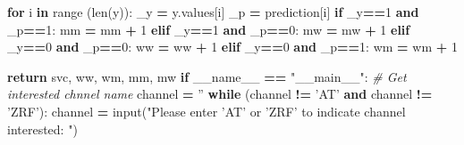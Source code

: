 \documentclass[10pt,letterpaper]{article}
\newenvironment{Shaded}{\begin{snugshade}}{\end{snugshade}}
\newcommand{\DecValTok}[1]{\textcolor[rgb]{0.00,0.00,0.81}{{#1}}}
\newcommand{\StringTok}[1]{\textcolor[rgb]{0.31,0.60,0.02}{{#1}}}
\newcommand{\CommentTok}[1]{\textcolor[rgb]{0.56,0.35,0.01}{\textit{{#1}}}}
\newcommand{\VariableTok}[1]{\textcolor[rgb]{0.00,0.00,0.00}{{#1}}}
\newcommand{\ControlFlowTok}[1]{\textcolor[rgb]{0.13,0.29,0.53}{\textbf{{#1}}}}
\newcommand{\OperatorTok}[1]{\textcolor[rgb]{0.81,0.36,0.00}{\textbf{{#1}}}}
\newcommand{\BuiltInTok}[1]{{#1}}
\newcommand{\NormalTok}[1]{{#1}}
\begin{document}
\begin{Shaded}
\begin{Highlighting}[]
    \ControlFlowTok{for} \NormalTok{i }\OperatorTok{in} \BuiltInTok{range} \NormalTok{(}\BuiltInTok{len}\NormalTok{(y)):}
        \NormalTok{_y }\OperatorTok{=} \NormalTok{y.values[i]}
        \NormalTok{_p }\OperatorTok{=} \NormalTok{prediction[i]}
        \ControlFlowTok{if} \NormalTok{_y}\OperatorTok{==}\DecValTok{1} \OperatorTok{and} \NormalTok{_p}\OperatorTok{==}\DecValTok{1}\NormalTok{:}
            \NormalTok{mm }\OperatorTok{=} \NormalTok{mm }\OperatorTok{+} \DecValTok{1}
        \ControlFlowTok{elif} \NormalTok{_y}\OperatorTok{==}\DecValTok{1} \OperatorTok{and} \NormalTok{_p}\OperatorTok{==}\DecValTok{0}\NormalTok{:}
            \NormalTok{mw }\OperatorTok{=} \NormalTok{mw }\OperatorTok{+} \DecValTok{1}
        \ControlFlowTok{elif} \NormalTok{_y}\OperatorTok{==}\DecValTok{0} \OperatorTok{and} \NormalTok{_p}\OperatorTok{==}\DecValTok{0}\NormalTok{:}
            \NormalTok{ww }\OperatorTok{=} \NormalTok{ww }\OperatorTok{+} \DecValTok{1}
        \ControlFlowTok{elif} \NormalTok{_y}\OperatorTok{==}\DecValTok{0} \OperatorTok{and} \NormalTok{_p}\OperatorTok{==}\DecValTok{1}\NormalTok{:}
            \NormalTok{wm }\OperatorTok{=} \NormalTok{wm }\OperatorTok{+} \DecValTok{1}
    
    \ControlFlowTok{return} \NormalTok{svc, ww, wm, mm, mw}
\ControlFlowTok{if} \VariableTok{__name__} \OperatorTok{==} \StringTok{"__main__"}\NormalTok{:}
    \CommentTok{# Get interested chnnel name}
    \NormalTok{channel }\OperatorTok{=} \StringTok{''}
    \ControlFlowTok{while} \NormalTok{(channel }\OperatorTok{!=} \StringTok{'AT'} \OperatorTok{and} \NormalTok{channel }\OperatorTok{!=} \StringTok{'ZRF'}\NormalTok{):}
        \NormalTok{channel }\OperatorTok{=} \BuiltInTok{input}\NormalTok{(}\StringTok{"Please enter 'AT' or 'ZRF' to indicate channel interested: "}\NormalTok{)}
    

\end{Highlighting}
\end{Shaded}
\end{document}
